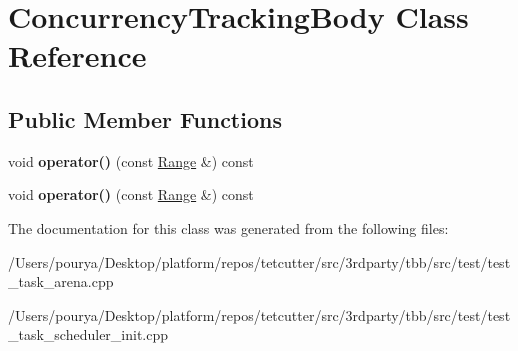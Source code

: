 \hypertarget{classConcurrencyTrackingBody}{}\section{Concurrency\+Tracking\+Body Class Reference}
\label{classConcurrencyTrackingBody}
\subsection*{Public Member Functions}
\begin{DoxyCompactItemize}
\item 
\hypertarget{classConcurrencyTrackingBody_aadee38ffa17dff9554956a4cce942824}{}void {\bfseries operator()} (const \hyperlink{classtbb_1_1blocked__range}{Range} \&) const \label{classConcurrencyTrackingBody_aadee38ffa17dff9554956a4cce942824}

\item 
\hypertarget{classConcurrencyTrackingBody_aadee38ffa17dff9554956a4cce942824}{}void {\bfseries operator()} (const \hyperlink{classtbb_1_1blocked__range}{Range} \&) const \label{classConcurrencyTrackingBody_aadee38ffa17dff9554956a4cce942824}

\end{DoxyCompactItemize}


The documentation for this class was generated from the following files\+:\begin{DoxyCompactItemize}
\item 
/\+Users/pourya/\+Desktop/platform/repos/tetcutter/src/3rdparty/tbb/src/test/test\+\_\+task\+\_\+arena.\+cpp\item 
/\+Users/pourya/\+Desktop/platform/repos/tetcutter/src/3rdparty/tbb/src/test/test\+\_\+task\+\_\+scheduler\+\_\+init.\+cpp\end{DoxyCompactItemize}
